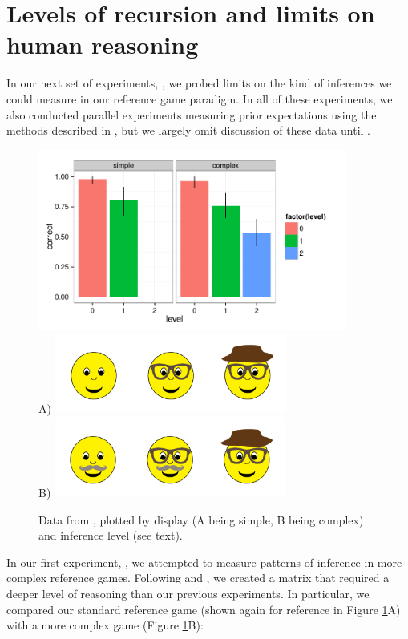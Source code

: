 \section{Levels of recursion and limits on human reasoning}
\label{sec:levels}

In our next set of experiments, , we probed limits on the kind of inferences we could measure in our reference game paradigm. In all of these experiments, we also conducted parallel experiments measuring prior expectations using the methods described in , but we largely omit discussion of these data until .


 \begin{figure}[t]
  \centering
  \includegraphics[width=4in]{../plots/3-levels-levels.pdf}\\ 
  A) \includegraphics[width=3in]{figures/hatglasses.pdf}\\
  B) \includegraphics[width=3in]{figures/levels-levels-stim.pdf}
  \caption{\label{fig:levels-level} Data from , plotted by display (A being simple, B being complex) and inference level (see text).}
\end{figure}


In our first experiment, , we attempted to measure patterns of inference in more complex reference games. Following  and , we created a matrix that required a deeper level of reasoning than our previous experiments. In particular, we compared our standard reference game (shown again for reference in Figure \ref{fig:levels-level}A) with a more complex game (Figure \ref{fig:levels-level}B):


